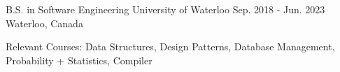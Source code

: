 

\begin{cventries}

  \cventry
    {B.S. in Software Engineering} %
    {University of Waterloo} %
    {Sep. 2018 - Jun. 2023} %
    {Waterloo, Canada} %
    {
      \begin{cvitems} %
        \item {Relevant Courses: Data Structures, Design Patterns, Database Management, Probability + Statistics, Compiler}
      \end{cvitems}
    }

\end{cventries}
